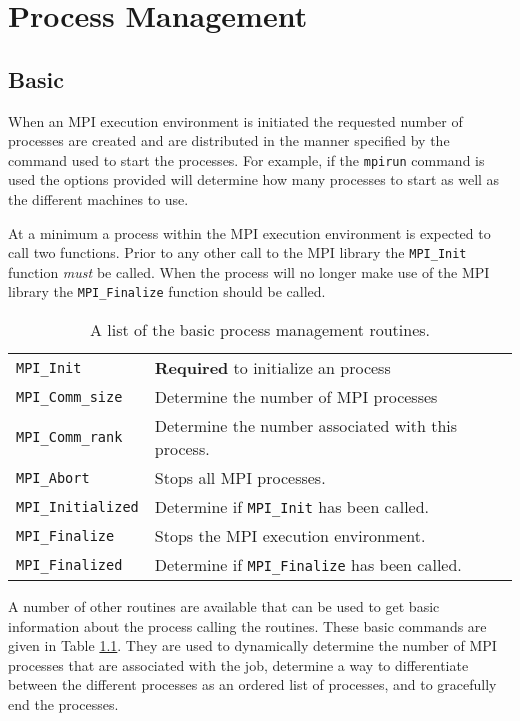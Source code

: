 \chapter{Process Management}

\section{Basic}


When an MPI execution environment is initiated the requested number of
processes are created and are distributed in the manner specified by
the command used to start the processes. For example, if the
\texttt{mpirun} command is used the options provided will determine
how many processes to start as well as the different machines to use.

At a minimum a process within the MPI execution environment is
expected to call two functions. Prior to any other call to the MPI
library the \texttt{MPI\_Init} function \textit{must} be called. When
the process will no longer make use of the MPI library the
\texttt{MPI\_Finalize} function should be called. 

\begin{table}
  \centering

  \begin{tabular}{ll}
    \texttt{MPI\_Init}        & \textbf{Required} to initialize an process \\
    \texttt{MPI\_Comm\_size}  & Determine the number of MPI processes \\
    \texttt{MPI\_Comm\_rank}  & Determine the number associated with this process. \\
    \texttt{MPI\_Abort}       & Stops all MPI processes. \\
    \texttt{MPI\_Initialized} & Determine if \texttt{MPI\_Init} has been called. \\
    \texttt{MPI\_Finalize}    & Stops the MPI execution environment. \\
    \texttt{MPI\_Finalized}   & Determine if \texttt{MPI\_Finalize} has been called.
  \end{tabular}
\caption{A list of the basic process management routines.}
\label{tab:basicProcessManagementCommands}
\end{table}


A number of other routines are available that can be used to get basic
information about the process calling the routines.  These basic
commands are given in Table
\ref{tab:basicProcessManagementCommands}. They are used to dynamically
determine the number of MPI processes that are associated with the
job, determine a way to differentiate between the different processes
as an ordered list of processes, and to gracefully end the processes.

